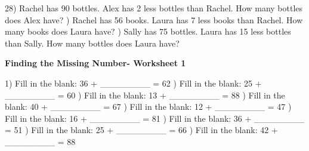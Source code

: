 \documentclass{article}%
\begin{document}
28) Rachel has 90 bottles. Alex has 2 less bottles than Rachel. How many bottles does Alex have?%
\newline%
\newline%
) Rachel has 56 books. Laura has 7 less books than Rachel. How many books does Laura have?%
\newline%
\newline%
) Sally has 75 bottles. Laura has 15 less bottles than Sally. How many bottles does Laura have?%
\newline%
\newline%
\newline%
\pagebreak%
\large%
\begin{center}%
\textbf{Finding the Missing Number- Worksheet 1}%
\newline%
\end{center} \normalsize%
1) Fill in the blank: 36 + \_\_\_\_\_\_\_\_ = 62%
\newline%
\newline%
) Fill in the blank: 25 + \_\_\_\_\_\_\_\_ = 60%
\newline%
\newline%
) Fill in the blank: 13 + \_\_\_\_\_\_\_\_ = 88%
\newline%
\newline%
) Fill in the blank: 40 + \_\_\_\_\_\_\_\_ = 67%
\newline%
\newline%
) Fill in the blank: 12 + \_\_\_\_\_\_\_\_ = 47%
\newline%
\newline%
) Fill in the blank: 16 + \_\_\_\_\_\_\_\_ = 81%
\newline%
\newline%
) Fill in the blank: 36 + \_\_\_\_\_\_\_\_ = 51%
\newline%
\newline%
) Fill in the blank: 25 + \_\_\_\_\_\_\_\_ = 66%
\newline%
\newline%
) Fill in the blank: 42 + \_\_\_\_\_\_\_\_ = 88%
\end{document}
